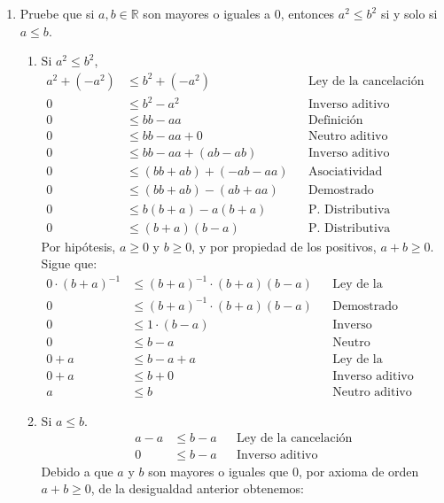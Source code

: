 \documentclass[11pt]{article}
\newcommand{\R}{\mathbb{R}}
\begin{document}
\begin{enumerate}
 \item Pruebe que si $a,b\in \R$ son mayores o iguales a $0$, entonces $a^2\leq b^2$ si y solo si $a\leq b$.
 \begin{enumerate}[label=\roman*)]
  \item Si $a^2\leq b^2$, \begin{align*}
   a^2 + (-a^2)&\leq b^2 +(-a^2)&& \text{Ley de la cancelación}\\
   0 &\leq b^2-a^2 && \text{Inverso aditivo}\\
   0 &\leq bb - aa && \text{Definición}\\
   0 &\leq bb - aa + 0 && \text{Neutro aditivo}\\
   0 &\leq bb - aa + (ab-ab) && \text{Inverso aditivo}\\
   0 &\leq (bb + ab) + (- ab - aa) && \text{Asociatividad}\\
   0 &\leq (bb + ab)-(ab+aa) && \text{Demostrado previamente}\\
   0 &\leq b(b+a)-a(b+a) && \text{P. Distributiva}\\
   0 &\leq (b+a)(b-a) && \text{P. Distributiva}
  \end{align*} Por hipótesis, $a\geq 0$ y $b\geq 0$, y por propiedad de los positivos, $a+b\geq 0$. Sigue que:\begin{align*}
   0 \cdot (b+a)^{-1}&\leq (b+a)^{-1}\cdot (b+a)(b-a) && \text{Ley de la cancelación}\\
   0 &\leq (b+a)^{-1}\cdot (b+a)(b-a) && \text{Demostrado anteriormente}\\
   0 &\leq 1 \cdot (b-a) && \text{Inverso multiplicativo}\\
   0 &\leq b-a && \text{Neutro multiplicativo}\\
   0 + a &\leq b-a+a && \text{Ley de la cancelación}\\
   0+a &\leq b+0 && \text{Inverso aditivo}\\
   a &\leq b && \text{Neutro aditivo}
  \end{align*}
  \item Si $a\leq b$. \begin{align*}
   a -a &\leq b-a && \text{Ley de la cancelación}\\
   0 &\leq b-a && \text{Inverso aditivo}
  \end{align*} Debido a que $a$ y $b$ son mayores o iguales que $0$, por axioma de orden $a+b\geq 0$, de la desigualdad anterior obtenemos:
  
  \pagebreak


\end{enumerate}
\end{enumerate}
\end{document}
